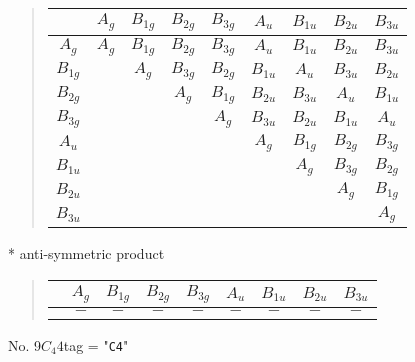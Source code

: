 \documentclass[fleqn,10pt,landscape]{jsarticle}
\begin{document}
\begin{quote}
\begin{tabular}{c|cccccccc} \hline \hline
 & $ A_{g} $ & $ B_{1g} $ & $ B_{2g} $ & $ B_{3g} $ & $ A_{u} $ & $ B_{1u} $ & $ B_{2u} $ & $ B_{3u} $ \\ \hline
$ A_{g} $ & $ A_{g} $ & $ B_{1g} $ & $ B_{2g} $ & $ B_{3g} $ & $ A_{u} $ & $ B_{1u} $ & $ B_{2u} $ & $ B_{3u} $ \\
$ B_{1g} $ & $  $ & $ A_{g} $ & $ B_{3g} $ & $ B_{2g} $ & $ B_{1u} $ & $ A_{u} $ & $ B_{3u} $ & $ B_{2u} $ \\
$ B_{2g} $ & $  $ & $  $ & $ A_{g} $ & $ B_{1g} $ & $ B_{2u} $ & $ B_{3u} $ & $ A_{u} $ & $ B_{1u} $ \\
$ B_{3g} $ & $  $ & $  $ & $  $ & $ A_{g} $ & $ B_{3u} $ & $ B_{2u} $ & $ B_{1u} $ & $ A_{u} $ \\
$ A_{u} $ & $  $ & $  $ & $  $ & $  $ & $ A_{g} $ & $ B_{1g} $ & $ B_{2g} $ & $ B_{3g} $ \\
$ B_{1u} $ & $  $ & $  $ & $  $ & $  $ & $  $ & $ A_{g} $ & $ B_{3g} $ & $ B_{2g} $ \\
$ B_{2u} $ & $  $ & $  $ & $  $ & $  $ & $  $ & $  $ & $ A_{g} $ & $ B_{1g} $ \\
$ B_{3u} $ & $  $ & $  $ & $  $ & $  $ & $  $ & $  $ & $  $ & $ A_{g} $ \\
 \hline \hline
\end{tabular}
\end{quote}
* anti-symmetric product
\begin{quote}
\begin{tabular}{ccccccccc} \hline \hline
 & $ A_{g} $ & $ B_{1g} $ & $ B_{2g} $ & $ B_{3g} $ & $ A_{u} $ & $ B_{1u} $ & $ B_{2u} $ & $ B_{3u} $ \\ \hline
$  $ & $ - $ & $ - $ & $ - $ & $ - $ & $ - $ & $ - $ & $ - $ & $ - $ \\
 \hline \hline
\end{tabular}
\end{quote}
\newpage
No. 9\quad$C_{4}$\quad$4$\quad[ tetragonal ]
tag = "{\tt C4}"
\end{document}
